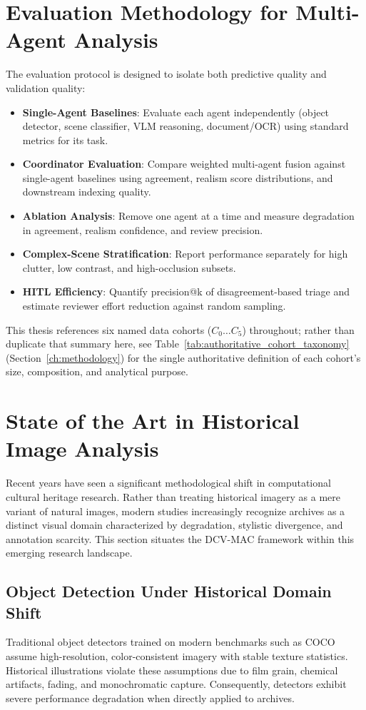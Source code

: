 \documentclass[12pt,a4paper]{report}
\begin{document}
\section{Evaluation Methodology for Multi-Agent Analysis}
The evaluation protocol is designed to isolate both predictive quality and validation quality:
\begin{itemize}
    \item \textbf{Single-Agent Baselines}: Evaluate each agent independently (object detector, scene classifier, VLM reasoning, document/OCR) using standard metrics for its task.
    \item \textbf{Coordinator Evaluation}: Compare weighted multi-agent fusion against single-agent baselines using agreement, realism score distributions, and downstream indexing quality.
    \item \textbf{Ablation Analysis}: Remove one agent at a time and measure degradation in agreement, realism confidence, and review precision.
    \item \textbf{Complex-Scene Stratification}: Report performance separately for high clutter, low contrast, and high-occlusion subsets.
    \item \textbf{HITL Efficiency}: Quantify precision@k of disagreement-based triage and estimate reviewer effort reduction against random sampling.
\end{itemize}

This thesis references six named data cohorts ($C_0 \dots C_5$) throughout; rather than duplicate that summary here, see Table~\ref{tab:authoritative_cohort_taxonomy} (Section~\ref{ch:methodology}) for the single authoritative definition of each cohort's size, composition, and analytical purpose.

\section{State of the Art in Historical Image Analysis}
Recent years have seen a significant methodological shift in computational cultural heritage research. Rather than treating historical imagery as a mere variant of natural images, modern studies increasingly recognize archives as a distinct visual domain characterized by degradation, stylistic divergence, and annotation scarcity. This section situates the DCV-MAC framework within this emerging research landscape.

\subsection{Object Detection Under Historical Domain Shift}
Traditional object detectors trained on modern benchmarks such as COCO \cite{coco2014} assume high-resolution, color-consistent imagery with stable texture statistics. Historical illustrations violate these assumptions due to film grain, chemical artifacts, fading, and monochromatic capture. Consequently, detectors exhibit severe performance degradation when directly applied to archives.
\end{document}
